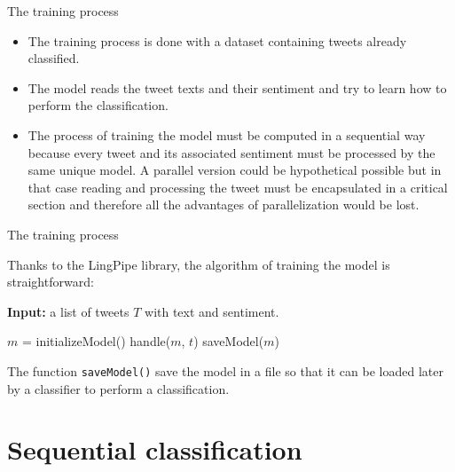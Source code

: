 \documentclass{beamer}
\begin{document}
\begin{frame}{The training process}

\begin{itemize}
\item
The training process is done with a dataset containing tweets already classified.
\item
The model reads the tweet texts and their sentiment and try to learn how to perform the classification.
\item
The process of training the model must be computed in a sequential way because every tweet and its associated sentiment must be processed by the same unique model. A parallel version could be hypothetical possible but in that case reading and processing the tweet must be encapsulated in a critical section and therefore all the advantages of parallelization would be lost.
\end{itemize}

\end{frame}


\begin{frame}[fragile]{The training process}

Thanks to the LingPipe library, the algorithm of training the model is straightforward:

\begin{algorithm}[H]
\caption{Training the model}
\textbf{Input:} a list of tweets $T$ with text and sentiment. \\
\begin{algorithmic}
    \State $m$ = initializeModel()
        \State handle($m$, $t$)
    \EndFor
    \State saveModel($m$)
\end{algorithmic}
\end{algorithm}

The function \verb"saveModel()" save the model in a file so that it can be loaded later by a classifier to perform a classification.

\end{frame}


\section{Sequential classification}
\end{document}
